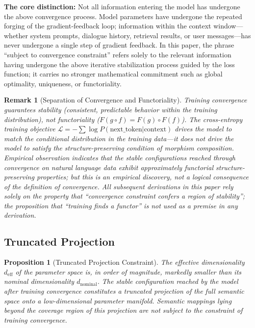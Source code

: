 \documentclass[11pt,a4paper]{article}
\newtheorem{proposition}[theorem]{Proposition}
\newtheorem{remark}[theorem]{Remark}
\theoremstyle{definition}
\begin{document}
\textbf{The core distinction:} Not all information entering the model has undergone the above convergence process. Model parameters have undergone the repeated forging of the gradient-feedback loop; information within the context window---whether system prompts, dialogue history, retrieval results, or user messages---has never undergone a single step of gradient feedback. In this paper, the phrase ``subject to convergence constraint'' refers solely to the relevant information having undergone the above iterative stabilization process guided by the loss function; it carries no stronger mathematical commitment such as global optimality, uniqueness, or functoriality.

\begin{remark}[Separation of Convergence and Functoriality]
Training convergence guarantees stability (consistent, predictable behavior within the training distribution), not functoriality ($F(g \circ f) = F(g) \circ F(f)$). The cross-entropy training objective $\mathcal{L} = -\sum \log P(\text{next\_token}|\text{context})$ drives the model to match the conditional distribution in the training data---it does not drive the model to satisfy the structure-preserving condition of morphism composition. Empirical observation indicates that the stable configurations reached through convergence on natural language data exhibit approximately functorial structure-preserving properties; but this is an empirical discovery, not a logical consequence of the definition of convergence. All subsequent derivations in this paper rely solely on the property that ``convergence constraint confers a region of stability''; the proposition that ``training finds a functor'' is not used as a premise in any derivation.
\end{remark}

\subsection{Truncated Projection}

\begin{proposition}[Truncated Projection Constraint]
The effective dimensionality $d_{\text{eff}}$ of the parameter space is, in order of magnitude, markedly smaller than its nominal dimensionality $d_{\text{nominal}}$. The stable configuration reached by the model after training convergence constitutes a truncated projection of the full semantic space onto a low-dimensional parameter manifold. Semantic mappings lying beyond the coverage region of this projection are not subject to the constraint of training convergence.
\end{proposition}
\end{document}
